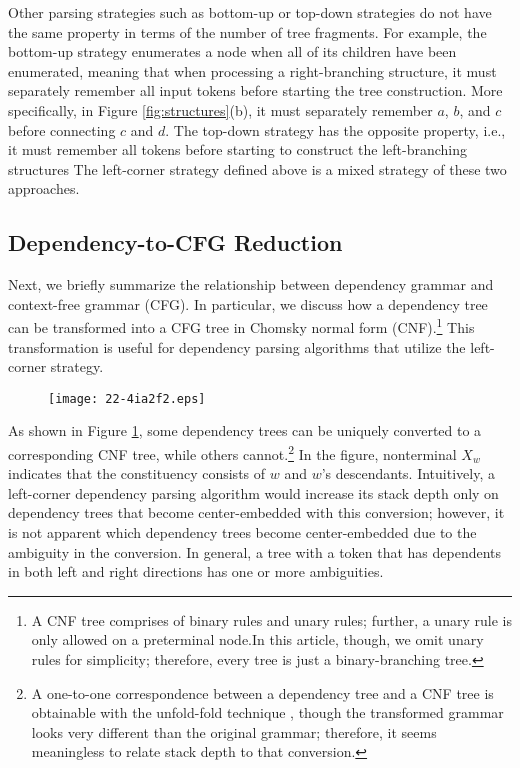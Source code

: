 \documentclass[english]{jnlp_1.4}
\begin{document}
Other parsing strategies such as bottom-up or top-down strategies do not have the same property in terms of the number of tree fragments.
For example, the bottom-up strategy enumerates a node when all of its children have been enumerated, meaning that when processing a right-branching structure, it must separately remember all input tokens before starting the tree construction.
    More specifically, in Figure \ref{fig:structures}(b), 
it must separately remember $a$, $b$, and $c$ before connecting $c$ and $d$.
The top-down strategy has the opposite property, i.e., it must remember all tokens before starting to construct the left-branching structures
The left-corner strategy defined above is a mixed strategy of these two approaches.


\subsection{Dependency-to-CFG Reduction}
\label{sec:reduction}

Next, we briefly summarize the relationship between dependency grammar and context-free grammar (CFG).
In particular, we discuss how a dependency tree can be transformed into a CFG tree in Chomsky normal form (CNF).\footnote{A CNF tree comprises of binary rules and unary rules; further, a unary rule is only allowed on a preterminal node.In this article, though, we omit unary rules for simplicity; therefore, every tree is just a binary-branching tree.}
This transformation is useful for dependency parsing algorithms that utilize the left-corner strategy.

\begin{figure}[b]
\vspace{-0.5\Cvs}
\begin{center}
\texttt{[image: 22-4ia2f2.eps]}
\end{center}
\label{fig:reduction}
\vspace{-0.5\Cvs}
\end{figure}

As shown in Figure \ref{fig:reduction}, some dependency trees can be uniquely converted to a corresponding CNF tree, while others cannot.\footnote{A one-to-one correspondence between a dependency tree and a CNF tree is obtainable with the unfold-fold technique \cite{johnson:2007:ACLMain}, though the transformed grammar looks very different than the original grammar; therefore, it seems meaningless to relate stack depth to that conversion.}
In the figure, nonterminal $X_w$ indicates that the constituency consists of $w$ and $w$'s descendants.
Intuitively, a left-corner dependency parsing algorithm would increase its stack depth only on dependency trees that become center-embedded with this conversion;
however, it is not apparent which dependency trees become center-embedded due to the ambiguity in the conversion.
In general, a tree with a token that has dependents in both left and right directions has one or more ambiguities.
\end{document}

